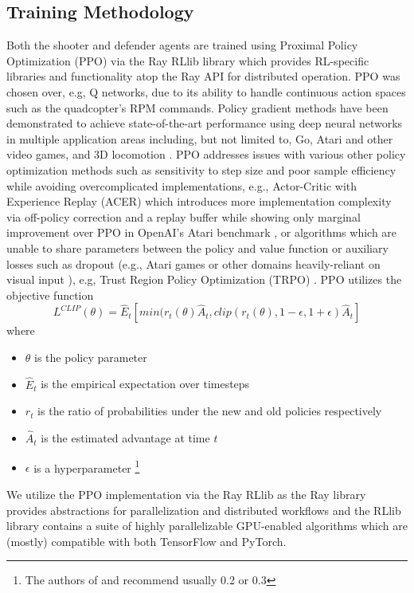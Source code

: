 \documentclass{article}
\begin{document}
\subsection{Training Methodology}\label{subsec:train_methods}
Both the shooter and defender agents are trained using Proximal Policy Optimization (PPO) \cite{Schulman2017} via the Ray RLlib library \cite{Liang2017} which provides RL-specific libraries and functionality atop the Ray API for distributed operation.
PPO was chosen over, e.g, Q networks, due to its ability to handle continuous action spaces such as the quadcopter's RPM commands. 
Policy gradient methods have been demonstrated to achieve state-of-the-art performance using deep neural networks in multiple application areas including, but not limited to, Go, Atari and other video games, and 3D locomotion \cite{ppo_site}. 
PPO addresses issues with various other policy optimization methods such as sensitivity to step size and poor sample efficiency while avoiding overcomplicated implementations, e.g., Actor-Critic with Experience Replay (ACER) \cite{wang2017sample} which introduces more implementation complexity via off-policy correction and a replay buffer while showing only marginal improvement over PPO in OpenAI's Atari benchmark \cite{ppo_site}, or algorithms which are unable to share parameters between the policy and value function or auxiliary losses such as dropout (e.g., Atari games or other domains heavily-reliant on visual input \cite{ppo_site}), e.g, Trust Region Policy Optimization (TRPO) \cite{schulman2017trust}. 
PPO utilizes the objective function
\begin{equation} \label{eq:ppo_loss}
L^{CLIP}(\theta) = \hat{E}_t[min(r_t(\theta) \hat{A}_t , clip(r_t(\theta), 1-\epsilon, 1+\epsilon) \hat{A}_t]
\end{equation}
where
\begin{itemize}
\item $\theta$ is the policy parameter
\item $\hat{E}_t$ is the empirical expectation over timesteps
\item $r_t$ is the ratio of probabilities under the new and old policies respectively
\item $\hat{A}_t$ is the estimated advantage at time $t$ 
\item $\epsilon$ is a hyperparameter \footnote{The authors of \cite{Schulman2017} and \cite{ppo_site} recommend usually 0.2 or 0.3}
\end{itemize}

\noindent
We utilize the PPO implementation via the Ray RLlib \cite{ray_ppo} as the Ray library provides abstractions for parallelization and distributed workflows and the RLlib library contains a suite of highly parallelizable GPU-enabled algorithms which are (mostly) compatible with both TensorFlow and PyTorch. 
\end{document}
